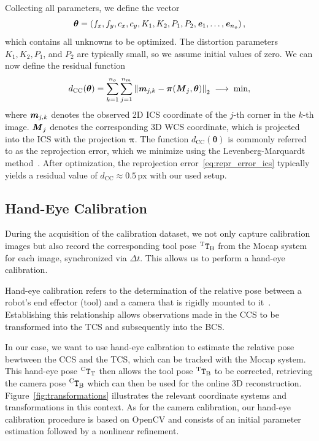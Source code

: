 \documentclass[a4paper,fleqn]{cas-dc}
\newcommand{\Vector}[1]{{\ensuremath{\textbf{\textit{#1}}}}}
\newcommand{\Matrix}[1]{{\ensuremath{\textbf{\texttt{#1}}}}}
\newcommand{\TMatrix}[3]{{^{\mathrm{#1}}\Matrix{#2}_{\mathrm{#3}}}}
\begin{document}
Collecting all parameters, we define the vector
\begin{equation}
    \boldsymbol{\theta} = \left(f_x, f_y, c_x, c_y, K_1, K_2, P_1, P_2, \Vector{e}_1, \dots, \Vector{e}_{n_o}\right),
\end{equation}
which contains all unknowns to be optimized. The distortion parameters $K_1, K_2, P_1$, and $P_2$ are typically small, so we assume initial values of zero. We can now define the residual function
\begin{equation}
    \label{eq:repr_error_ics}
    d_{\mathrm{CC}}(\boldsymbol{\theta}) = \sum_{k=1}^{n_o} \sum_{j=1}^{n_m}
        \left\| \Vector{m}_{j,k} - \boldsymbol{\pi}\!\left( \Vector{M}_j, \boldsymbol{\theta} \right) \right\|_2
        \;\longrightarrow\; \mathrm{min},
\end{equation}
where $\Vector{m}_{j,k}$ denotes the observed 2D ICS coordinate of the $j$-th corner in the $k$-th image. $\Vector{M}_j$ denotes the corresponding 3D WCS coordinate, which is projected into the ICS with the projection $\boldsymbol{\pi}$. The function $d_{\mathrm{CC}}(\boldsymbol{\theta})$ is commonly referred to as the reprojection error, which we minimize using the Levenberg-Marquardt method~\cite{marquardt_algorithm_1963}. After optimization, the reprojection error~\eqref{eq:repr_error_ics} typically yields a residual value of $d_{\mathrm{CC}}\approx 0.5\,\mathrm{px}$ with our used setup.

\subsection{Hand-Eye Calibration}\label{ssec:methodology:hec}
During the acquisition of the calibration dataset, we not only capture calibration images but also record the corresponding tool pose $\TMatrix{T}{T}{B}$ from the Mocap system for each image, synchronized via $\Delta t$. This allows us to perform a hand-eye calibration.

Hand-eye calibration refers to the determination of the relative pose between a robot's end effector (tool) and a camera that is rigidly mounted to it~\cite{daniilidis_hand-eye_1999}. Establishing this relationship allows observations made in the CCS to be transformed into the TCS and subsequently into the BCS.

In our case, we want to use hand-eye calbration to estimate the relative pose bewtween the CCS and the TCS, which can be tracked with the Mocap system. This hand-eye pose $\TMatrix{C}{T}{T}$ then allows the tool pose $\TMatrix{T}{T}{B}$ to be corrected, retrieving the camera pose $\TMatrix{C}{T}{B}$ which can then be used for the online 3D reconstruction. Figure~\ref{fig:transformations} illustrates the relevant coordinate systems and transformations in this context. As for the camera calibration, our hand-eye calibration procedure is based on OpenCV and consists of an initial parameter estimation followed by a nonlinear refinement.
\end{document}
